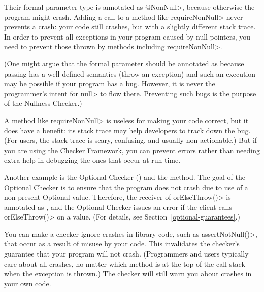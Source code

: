 Their formal parameter type is annotated as \<@NonNull>, because otherwise the
program might crash.  Adding a call to a method like \<requireNonNull>
never prevents a crash:  your code still crashes, but with a slightly
different stack trace.  In order to prevent all exceptions in your program
caused by null pointers, you need to prevent those thrown by methods including
\<requireNonNull>.

(One might argue that the formal parameter should be annotated as
 because passing  has a
well-defined semantics (throw an exception) and such an execution may be
possible if your program has a bug.  However, it is never the programmer's
intent for \<null> to flow there.  Preventing such bugs is the purpose of
the Nullness Checker.)

A method like \<requireNonNull> is useless for making your code correct,
but it does have a benefit:  its stack trace may help developers to track
down the bug.  (For users, the stack trace is scary, confusing, and usually
non-actionable.)  But if you are using the Checker Framework, you can
prevent errors rather than needing extra help in debugging the ones that
occur at run time.


Another example is the Optional Checker ()
and the  method.
The goal of the Optional Checker is to ensure that the program does not
crash due to use of a non-present Optional value.  Therefore, the receiver
of
\<orElseThrow()> is annotated as
,
and the Optional Checker issues an error if the client calls
\<orElseThrow()> on a  value.
(For details, see Section~\ref{optional-guarantees}.)


You can make a checker ignore crashes in library code, such as
\<assertNotNull()>, that occur as a result of misuse by your code.
This invalidates the checker's guarantee that your program will not crash.
(Programmers and users typically care about all crashes, no matter which
method is at the top of the call stack when the exception is thrown.)
The checker will still warn you about crashes in your own code.

